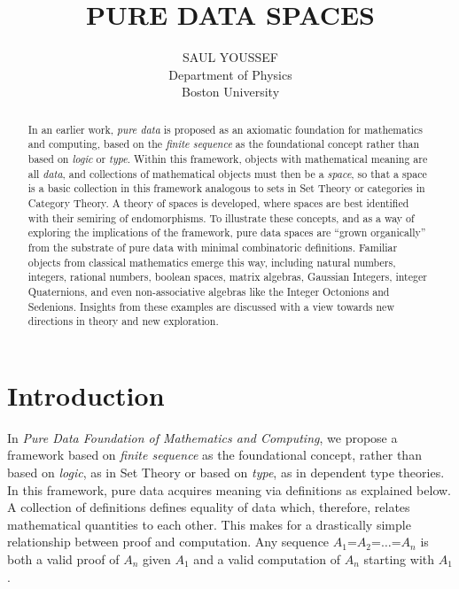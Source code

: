 \documentclass[11pt]{article}
\begin{document}
\title{\bf {PURE DATA SPACES}}
\author{%
  SAUL YOUSSEF%
  \hfil \\
  Department of Physics \\
  Boston University \\
}
\maketitle
\begin{abstract}
In an earlier work, {\it pure data} is proposed as an axiomatic foundation for mathematics and computing, based on the {\it finite sequence} as 
the foundational concept rather than based on {\it logic} or {\it type}.   Within this framework, objects with mathematical meaning are 
all {\it data}, and collections of mathematical objects must then be a {\it space}, so that a space is a basic collection in this 
framework analogous to sets in Set Theory or categories in Category Theory.  A theory of spaces is developed, where 
spaces are best identified with their semiring of endomorphisms.  To illustrate these concepts, and as a way of 
exploring the implications of the framework, pure data spaces are ``grown organically'' from the substrate of 
pure data with minimal combinatoric definitions.  Familiar objects from classical mathematics emerge this way,   
including natural numbers, integers, rational numbers, boolean spaces, matrix algebras, Gaussian Integers, 
integer Quaternions, and even non-associative algebras like the Integer Octonions and Sedenions. 
Insights from these examples are discussed with a view towards new directions in theory and new exploration.
\end{abstract}

\theoremstyle{definition}
\newtheorem{axiom}{Axiom}
\newtheorem*{axiom*}{Axiom}
\newtheorem*{fact}{Fact}
\newtheorem{theorem}{Theorem}[section]
\newtheorem{lemma}{Lemma}
\newtheorem{corollary}[theorem]{Corollary}

\newtheorem{definition}{Definition}

\newtheorem*{remark}{}

\section{Introduction}

    In {\it Pure Data Foundation of Mathematics and Computing}\cite{PDF}, we propose a framework based on {\it finite sequence} as the foundational concept, rather than based on {\it logic}, as in Set Theory or 
based on {\it type}, as in dependent type theories.  In this framework, pure data acquires meaning via definitions as 
explained below.  A collection of definitions defines equality of data which, therefore, relates mathematical quantities to 
each other.  This makes for a drastically simple relationship between proof and computation.   
Any sequence $A_1$=$A_2$=$\dots$=$A_n$ is both a valid proof of $A_n$ given $A_1$ and a valid computation 
of $A_n$ starting with $A_1$.  
\end{document}
